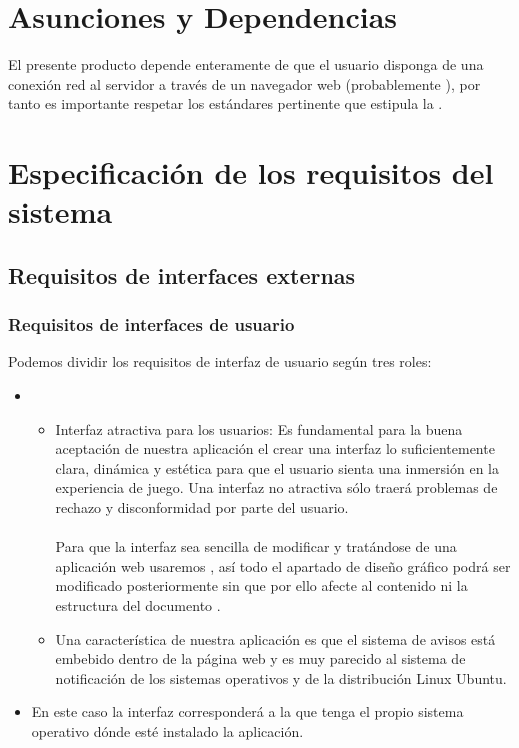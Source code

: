 \section{Asunciones y Dependencias}
El presente producto depende enteramente de que el usuario disponga de una
conexión red al servidor a través de un navegador web (probablemente
), por tanto es importante respetar los estándares pertinente
que estipula la .

\section{Especificación de los requisitos del sistema}
\subsection{Requisitos de interfaces externas}
\subsubsection{Requisitos de interfaces de usuario}
Podemos dividir los requisitos de interfaz de usuario según tres roles:

\begin{itemize}
\item {}
  \begin{itemize}
  \item Interfaz atractiva para los usuarios: Es fundamental para la buena
    aceptación de nuestra aplicación el crear una interfaz lo suficientemente
    clara, dinámica y estética para que el usuario sienta una inmersión en la
    experiencia de juego. Una interfaz no atractiva sólo traerá problemas de
    rechazo y disconformidad por parte del usuario.\\\\
    Para que la interfaz sea sencilla de modificar y tratándose de una
    aplicación web usaremos , así todo el apartado
    de diseño gráfico podrá ser modificado posteriormente sin que por ello
    afecte al contenido ni la estructura del documento .
  \item Una característica de nuestra aplicación es que el sistema de avisos
    está embebido dentro de la página web y es muy parecido al sistema de
    notificación de los sistemas operativos  y de la \cursiva
    {distribución Linux Ubuntu}.
  \end{itemize}
\item {} En este caso la interfaz corresponderá a la que
  tenga el propio sistema operativo dónde esté instalado la aplicación.
\end{itemize}


